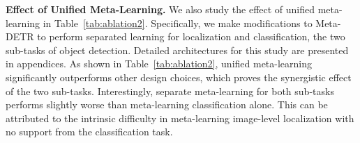 \documentclass[10pt,twocolumn,letterpaper]{article}
\begin{document}
\smallskip
\noindent
\textbf{Effect of Unified Meta-Learning.}
We also study the effect of unified meta-learning in Table~\ref{tab:ablation2}. Specifically, we make modifications to Meta-DETR to perform separated learning for localization and classification, the two sub-tasks of object detection. Detailed architectures for this study are presented in appendices. As shown in Table~\ref{tab:ablation2}, unified meta-learning significantly outperforms other design choices, which proves the synergistic effect of the two sub-tasks. Interestingly, separate meta-learning for both sub-tasks performs slightly worse than meta-learning classification alone. This can be attributed to the intrinsic difficulty in meta-learning image-level localization with no support from the classification task.




\begin{table}
\begin{center}
\end{center}
\vspace*{-1.8mm}
\caption{Ablation studies over the effect of unified meta-learning. Results for novel categories are averaged over multiple runs on the category split 1 of Pascal VOC.}
\label{tab:ablation2}
\vspace*{-0.8mm}
\end{table} 
\end{document}
